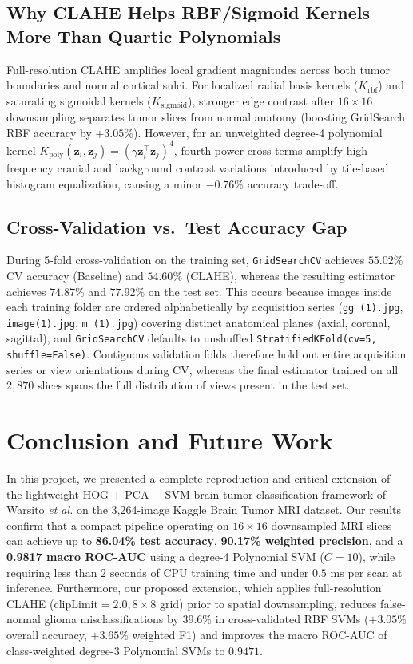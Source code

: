 \documentclass[conference]{IEEEtran}
\begin{document}
\subsection{Why CLAHE Helps RBF/Sigmoid Kernels More Than Quartic Polynomials}
Full-resolution CLAHE amplifies local gradient magnitudes across both tumor boundaries and normal cortical sulci. For localized radial basis kernels ($K_{\text{rbf}}$) and saturating sigmoidal kernels ($K_{\text{sigmoid}}$), stronger edge contrast after $16 \times 16$ downsampling separates tumor slices from normal anatomy (boosting GridSearch RBF accuracy by $+3.05\%$). However, for an unweighted degree-4 polynomial kernel $K_{\text{poly}}(\mathbf{z}_i, \mathbf{z}_j) = (\gamma \mathbf{z}_i^\top \mathbf{z}_j)^4$, fourth-power cross-terms amplify high-frequency cranial and background contrast variations introduced by tile-based histogram equalization, causing a minor $-0.76\%$ accuracy trade-off.

\subsection{Cross-Validation vs.\ Test Accuracy Gap}
During 5-fold cross-validation on the training set, \texttt{GridSearchCV} achieves $55.02\%$ CV accuracy (Baseline) and $54.60\%$ (CLAHE), whereas the resulting estimator achieves $74.87\%$ and $77.92\%$ on the test set. This occurs because images inside each training folder are ordered alphabetically by acquisition series (\texttt{gg (1).jpg}, \texttt{image(1).jpg}, \texttt{m (1).jpg}) covering distinct anatomical planes (axial, coronal, sagittal), and \texttt{GridSearchCV} defaults to unshuffled \texttt{StratifiedKFold(cv=5, shuffle=False)}. Contiguous validation folds therefore hold out entire acquisition series or view orientations during CV, whereas the final estimator trained on all $2,870$ slices spans the full distribution of views present in the test set.


\section{Conclusion and Future Work}
In this project, we presented a complete reproduction and critical extension of the lightweight HOG + PCA + SVM brain tumor classification framework of Warsito \emph{et al.} \cite{warsito2026lightweight} on the 3,264-image Kaggle Brain Tumor MRI dataset. Our results confirm that a compact pipeline operating on $16 \times 16$ downsampled MRI slices can achieve up to \textbf{86.04\% test accuracy}, \textbf{90.17\% weighted precision}, and a \textbf{0.9817 macro ROC-AUC} using a degree-4 Polynomial SVM ($C=10$), while requiring less than $2\text{ seconds}$ of CPU training time and under $0.5\text{ ms}$ per scan at inference. Furthermore, our proposed extension, which applies full-resolution CLAHE ($\text{clipLimit}=2.0, 8 \times 8$ grid) prior to spatial downsampling, reduces false-normal glioma misclassifications by $39.6\%$ in cross-validated RBF SVMs ($+3.05\%$ overall accuracy, $+3.65\%$ weighted F1) and improves the macro ROC-AUC of class-weighted degree-3 Polynomial SVMs to $0.9471$.
\end{document}
